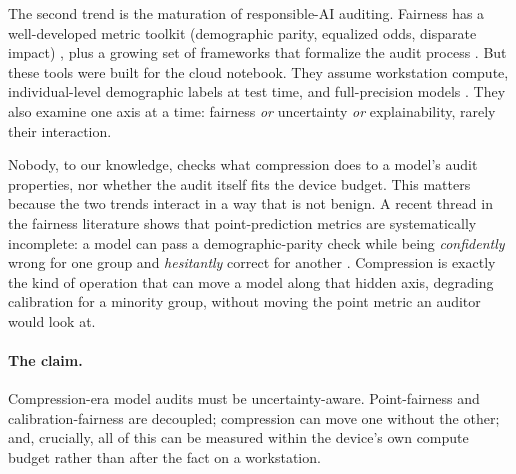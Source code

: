 \documentclass[11pt]{article}
\begin{document}
The second trend is the maturation of responsible-AI auditing. Fairness has a
well-developed metric toolkit (demographic parity, equalized odds, disparate
impact) \cite{pagano2023fairness}, plus a growing set of frameworks that
formalize the audit process \cite{maneriker2023avoir,lalor2024fairframe}. But
these tools were built for the cloud notebook. They assume workstation compute,
individual-level demographic labels at test time, and full-precision models
\cite{lee2021landscape,deng2022exploring,han2024ffb}. They also examine one axis
at a time: fairness \emph{or} uncertainty \emph{or} explainability, rarely their
interaction.

Nobody, to our knowledge, checks what compression does to a model's audit
properties, nor whether the audit itself fits the device budget. This matters
because the two trends interact in a way that is not benign. A recent thread in
the fairness literature shows that point-prediction metrics are systematically
incomplete: a model can pass a demographic-parity check while being
\emph{confidently} wrong for one group and \emph{hesitantly} correct for another
\cite{kuzucu2024uncertainty,rosenblatt2024fairlyuncertain}. Compression is
exactly the kind of operation that can move a model along that hidden axis,
degrading calibration for a minority group, without moving the point metric an
auditor would look at.

\paragraph{The claim.} Compression-era model audits must be uncertainty-aware.
Point-fairness and calibration-fairness are decoupled; compression can move one
without the other; and, crucially, all of this can be measured within the
device's own compute budget rather than after the fact on a workstation.
\end{document}
